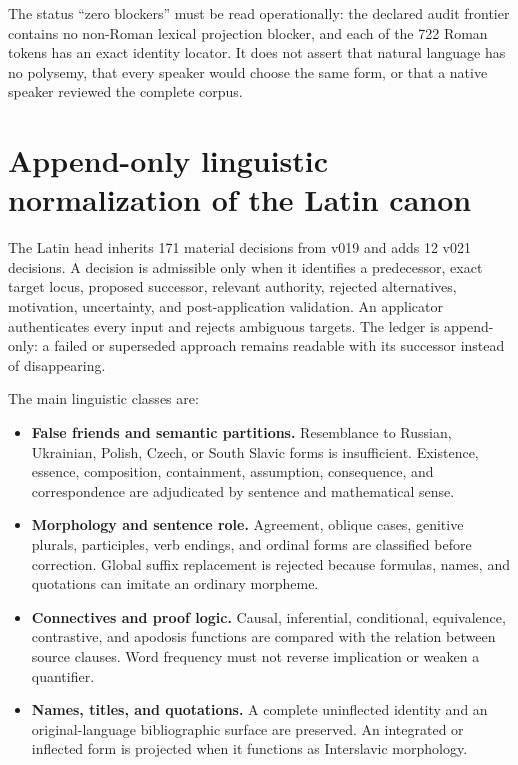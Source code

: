 \documentclass[11pt]{article}
\begin{document}
The status ``zero blockers'' must be read operationally: the declared audit frontier contains no non-Roman lexical projection blocker, and each of the 722 Roman tokens has an exact identity locator. It does not assert that natural language has no polysemy, that every speaker would choose the same form, or that a native speaker reviewed the complete corpus.

\section{Append-only linguistic normalization of the Latin canon}

The Latin head inherits 171 material decisions from v019 and adds 12 v021 decisions. A decision is admissible only when it identifies a predecessor, exact target locus, proposed successor, relevant authority, rejected alternatives, motivation, uncertainty, and post-application validation. An applicator authenticates every input and rejects ambiguous targets. The ledger is append-only: a failed or superseded approach remains readable with its successor instead of disappearing.

The main linguistic classes are:

\begin{itemize}
\item \textbf{False friends and semantic partitions.} Resemblance to Russian, Ukrainian, Polish, Czech, or South Slavic forms is insufficient. Existence, essence, composition, containment, assumption, consequence, and correspondence are adjudicated by sentence and mathematical sense.
\item \textbf{Morphology and sentence role.} Agreement, oblique cases, genitive plurals, participles, verb endings, and ordinal forms are classified before correction. Global suffix replacement is rejected because formulas, names, and quotations can imitate an ordinary morpheme.
\item \textbf{Connectives and proof logic.} Causal, inferential, conditional, equivalence, contrastive, and apodosis functions are compared with the relation between source clauses. Word frequency must not reverse implication or weaken a quantifier.
\item \textbf{Names, titles, and quotations.} A complete uninflected identity and an original-language bibliographic surface are preserved. An integrated or inflected form is projected when it functions as Interslavic morphology.
\end{itemize}
\end{document}
